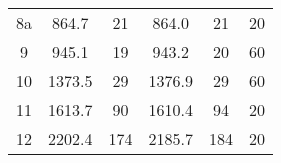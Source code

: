 \begin{table}[H]
\begin{tabular}{@{}cccccc@{}}
8a                                & 864.7                                                                                     & 21                                     & 864.0                                                                                     & 21                                     & 20                                                                                        \\
9                                 & 945.1                                                                                     & 19                                     & 943.2                                                                                     & 20                                     & 60                                                                                        \\
10                                & 1373.5                                                                                    & 29                                     & 1376.9                                                                                    & 29                                     & 60                                                                                        \\
11                                & 1613.7                                                                                    & 90                                     & 1610.4                                                                                    & 94                                     & 20                                                                                        \\
12                                & 2202.4                                                                                    & 174                                    & 2185.7                                                                                    & 184                                    & 20                                                                                        \\ \bottomrule
\end{tabular}
\end{table}




